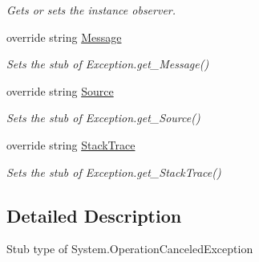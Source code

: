 \begin{DoxyCompactItemize}
\begin{DoxyCompactList}\small\item\em Gets or sets the instance observer.\end{DoxyCompactList}\item 
override string \hyperlink{class_system_1_1_fakes_1_1_stub_operation_canceled_exception_a468382393c3d9dd8029035d81ac17f27}{Message}
\begin{DoxyCompactList}\small\item\em Sets the stub of Exception.\-get\-\_\-\-Message()\end{DoxyCompactList}\item 
override string \hyperlink{class_system_1_1_fakes_1_1_stub_operation_canceled_exception_a6ad7e55f09cbe9cfa9ce7c7fe87ad090}{Source}
\begin{DoxyCompactList}\small\item\em Sets the stub of Exception.\-get\-\_\-\-Source()\end{DoxyCompactList}\item 
override string \hyperlink{class_system_1_1_fakes_1_1_stub_operation_canceled_exception_a4c30f9cf5688d6aac7079dc59e4e19e5}{Stack\-Trace}
\begin{DoxyCompactList}\small\item\em Sets the stub of Exception.\-get\-\_\-\-Stack\-Trace()\end{DoxyCompactList}\end{DoxyCompactItemize}


\subsection{Detailed Description}
Stub type of System.\-Operation\-Canceled\-Exception



